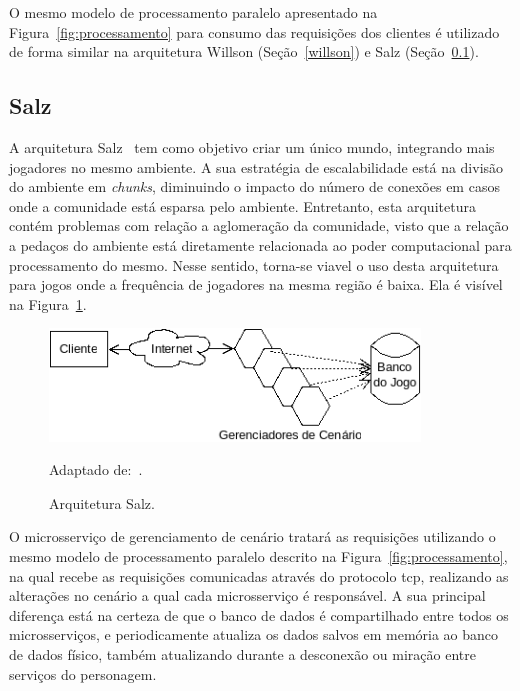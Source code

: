 O mesmo modelo de processamento paralelo apresentado na Figura~\ref{fig:processamento} para consumo das requisições dos clientes é utilizado de forma similar na arquitetura Willson (Seção~\ref{willson}) e Salz (Seção~\ref{salz}).


\subsection{Salz}
\label{salz}



A arquitetura Salz~\cite{albion_online_unite} tem como objetivo criar um único mundo, integrando mais jogadores no mesmo ambiente.
%
A sua estratégia de escalabilidade está na divisão do ambiente em \textit{chunks}, diminuindo o impacto do número de conexões em casos onde a comunidade está esparsa pelo ambiente.
%
Entretanto, esta arquitetura contém problemas com relação a aglomeração da comunidade, visto que a relação a pedaços do ambiente está diretamente relacionada ao poder computacional para processamento do mesmo.
%
Nesse sentido, torna-se viavel o uso desta arquitetura para jogos onde a frequência de jogadores na mesma região é baixa.
%
Ela é visível na Figura~\ref{fig:salz}.


\begin{figure}[htb!]
  \caption{Arquitetura Salz.}
  \label{fig:salz}
  \includegraphics[height=3cm]{img/cap3/salz.png}
  \centering

  Adaptado de:~\cite{albion_online_unite}.
\end{figure}


O microsserviço de gerenciamento de cenário tratará as requisições utilizando o mesmo modelo de processamento paralelo descrito na Figura~\ref{fig:processamento}, na qual recebe as requisições comunicadas através do protocolo \ac{tcp}, realizando as alterações no cenário a qual cada microsserviço é responsável.
%
A sua principal diferença está na certeza de que o banco de dados é compartilhado entre todos os microsserviços, e periodicamente atualiza os dados salvos em memória ao banco de dados físico, também atualizando durante a desconexão ou miração entre serviços do personagem.



